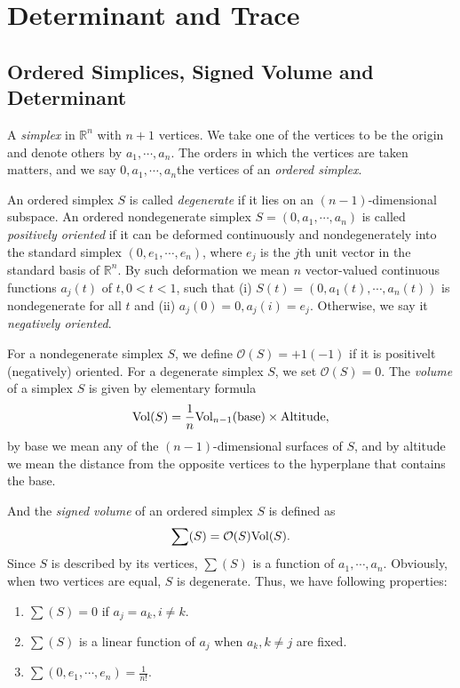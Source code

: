\documentclass[11pt]{book}
\theoremstyle{definition}
\numberwithin{equation}{chapter}
\begin{document}
\chapter{Determinant and Trace}
\section{Ordered Simplices, Signed Volume and Determinant}
A \emph{simplex} in $\mathbb{R}^n$ with $n+1$ vertices. We take one of the vertices to be the origin and denote others by $a_1,\cdots, a_n$. The orders in which the vertices are taken matters, and we say $0, a_1,\cdots, a_n$the vertices of an \emph{ordered simplex}.

An ordered simplex $S$ is called \emph{degenerate} if it lies on an $(n-1)$-dimensional subspace. An ordered nondegenerate simplex $S = (0, a_1,\cdots, a_n)$ is called \emph{positively oriented} if it can be deformed continuously and nondegenerately into the standard simplex $(0, e_1,\cdots, e_n)$, where $e_j$ is the $j$th unit vector in the standard basis of $\mathbb{R}^n$. By such deformation we mean $n$ vector-valued continuous functions $a_j(t)$ of $t,0 < t < 1$, such that (i) $S(t) = (0,a_1(t),\cdots, a_n(t))$ is nondegenerate for all $t$ and (ii) $a_j(0) = 0, a_j(i) = e_j$. 
Otherwise, we say it \emph{negatively oriented}. 

For a nondegenerate simplex $S$, we define $\mathcal{O}(S) = +1(-1)$ if it is positivelt (negatively) oriented. For a degenerate simplex $S$, we set $\mathcal{O}(S) = 0$. The \emph{volume} of a simplex $S$ is given by elementary formula
\begin{align*}
    {\rm Vol}(S) = \frac{1}{n} {\rm Vol}_{n-1}({\rm base}) \times {\rm Altitude},
\end{align*}
by base we mean any of the $(n-1)$-dimensional surfaces of $S$, and by altitude we mean the distance from the opposite vertices to the hyperplane that contains the base. 

And the \emph{signed volume} of an ordered simplex $S$ is defined as 
\begin{align*}
    \sum (S) = \mathcal{O}(S){\rm Vol}(S).
\end{align*}
Since $S$ is described by its vertices, $\sum (S)$ is a function of $a_1,\cdots,a_n$. Obviously, when two vertices are equal, $S$ is degenerate. Thus, we have following properties:
\begin{enumerate}[label=(\arabic*)]
    \item $\sum (S) = 0$ if $a_j = a_k, i\neq k$.
    \item $\sum (S)$ is a linear function of $a_j$ when $a_k, k\neq j$ are fixed.
    \item $\sum (0,e_1,\cdots,e_n) = \frac{1}{n!}$.
\end{enumerate}
\end{document}
